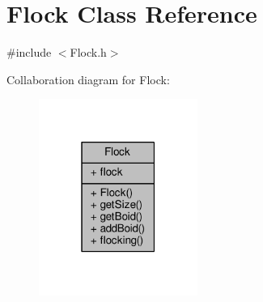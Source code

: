 \hypertarget{class_flock}{}\section{Flock Class Reference}
\label{class_flock}


{\ttfamily \#include $<$Flock.\+h$>$}



Collaboration diagram for Flock\+:
\nopagebreak
\begin{figure}[H]
\begin{center}
\leavevmode
\includegraphics[width=147pt]{class_flock__coll__graph}
\end{center}
\end{figure}
